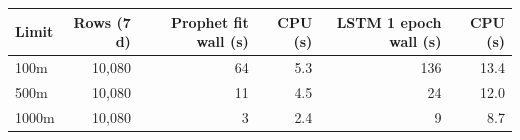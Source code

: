 \begin{tabular}{lrrrrr}
\toprule
Limit & Rows (7 d) & Prophet fit wall (s) & CPU (s) & LSTM 1 epoch wall (s) & CPU (s) \\
\midrule
100m & 10,080 & 64 & 5.3 & 136 & 13.4 \\
500m & 10,080 & 11 & 4.5 & 24 & 12.0 \\
1000m & 10,080 & 3 & 2.4 & 9 & 8.7 \\
\bottomrule
\end{tabular}
